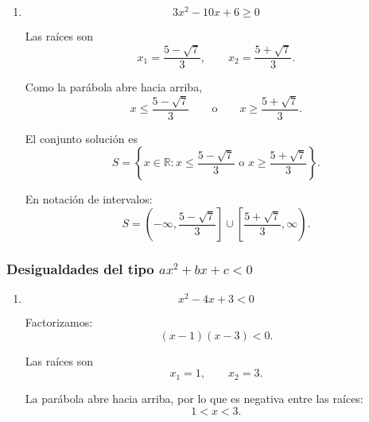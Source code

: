 \documentclass[12pt]{article}
\begin{document}
{\begin{enumerate}
Multiplicamos por \(2\):
\[
2x^2+x-1\geq0.
\]

Factorizamos:
\[
(2x-1)(x+1)\geq0.
\]

Las raíces son
\[
x_1=-1,
\qquad
x_2=\frac{1}{2}.
\]

Por tanto,
\[
x\leq-1
\qquad\text{o}\qquad
x\geq\frac{1}{2}.
\]

El conjunto solución es
\[
\boxed{
S=
\left\{
x\in\mathbb{R}:
x\leq-1
\text{ o }
x\geq\frac{1}{2}
\right\}.
}
\]

En notación de intervalos:
\[
\boxed{
S=
(-\infty,-1]
\cup
\left[\frac{1}{2},\infty\right).
}
\]

Representación gráfica:
\[
\longleftarrow\!\!=\!\!=\!\bullet
\quad-1
\qquad\qquad
\frac{1}{2}\quad
\bullet\!\!=\!\!=\!\longrightarrow
\]

\item
\[
3x^2-10x+6\geq0
\]

Las raíces son
\[
x_1=\frac{5-\sqrt{7}}{3},
\qquad
x_2=\frac{5+\sqrt{7}}{3}.
\]

Como la parábola abre hacia arriba,
\[
x\leq
\frac{5-\sqrt{7}}{3}
\qquad\text{o}\qquad
x\geq
\frac{5+\sqrt{7}}{3}.
\]

El conjunto solución es
\[
\boxed{
S=
\left\{
x\in\mathbb{R}:
x\leq\frac{5-\sqrt{7}}{3}
\text{ o }
x\geq\frac{5+\sqrt{7}}{3}
\right\}.
}
\]

En notación de intervalos:
\[
\boxed{
S=
\left(
-\infty,
\frac{5-\sqrt{7}}{3}
\right]
\cup
\left[
\frac{5+\sqrt{7}}{3},
\infty
\right).
}
\]

\end{enumerate}

\subsubsection*{Desigualdades del tipo \(ax^2+bx+c<0\)}

\begin{enumerate}

\item
\[
x^2-4x+3<0
\]

Factorizamos:
\[
(x-1)(x-3)<0.
\]

Las raíces son
\[
x_1=1,
\qquad
x_2=3.
\]

La parábola abre hacia arriba, por lo que es negativa entre las raíces:
\[
1<x<3.
\]


\end{enumerate}}
\end{document}
